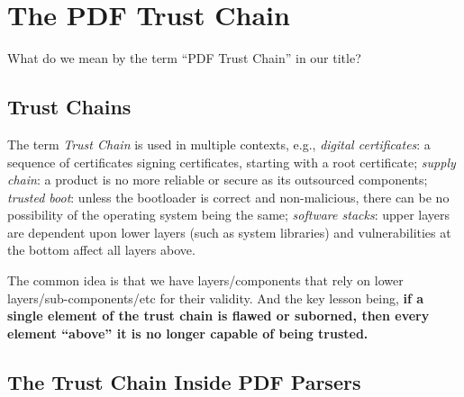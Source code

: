 \section{The PDF Trust Chain }
\label{sec:trust-chain}

What do we mean by the term ``PDF Trust Chain'' in our title?

\subsection{Trust Chains}

The term \emph{Trust Chain} is used in multiple contexts, e.g.,
\emph{digital certificates}: a sequence of certificates signing certificates,
starting with a root certificate;
\emph{supply chain}: a product is no more reliable or secure as its
outsourced components;
\emph{trusted boot}: unless the bootloader is correct and non-malicious,
there can be no possibility of the operating system being the same;
\emph{software stacks}: upper layers are dependent upon lower layers (such as
system libraries) and vulnerabilities at the bottom affect all layers above.

The common idea is that we have layers/components that rely on lower
layers/sub-components/etc for their validity.
And the key lesson being,
{\bf{if a single element of the trust chain 
  is flawed or suborned, then every element ``above'' it
  is no longer capable of being trusted.}}


\subsection{The Trust Chain Inside PDF Parsers}


